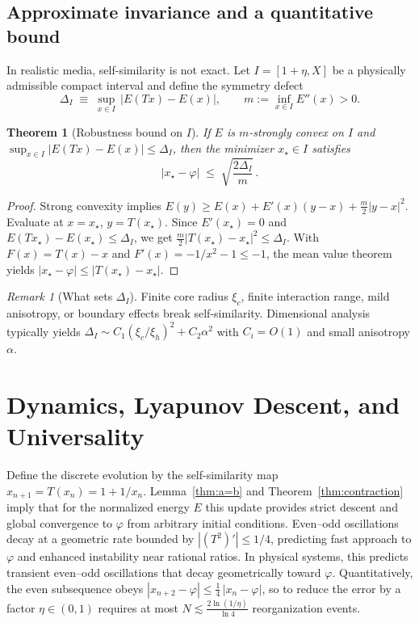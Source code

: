 \documentclass[11pt]{article}
\newtheorem{theorem}{Theorem}
\theoremstyle{remark}
\newtheorem{remark}{Remark}
\theoremstyle{definition}
\newcommand{\ph}{\varphi}
\begin{document}
\subsection{Approximate invariance and a quantitative bound}
In realistic media, self-similarity is not exact. Let $I=[1+\eta,X]$ be a physically admissible compact interval and define the symmetry defect
\begin{equation}
 \Delta_I\;\equiv\;\sup_{x\in I}\,\bigl|E(Tx)-E(x)\bigr|,\qquad m:=\inf_{x\in I}E''(x)>0.
\end{equation}
\begin{theorem}[Robustness bound on $I$]
\label{thm:robust}
If $E$ is $m$-strongly convex on $I$ and $\sup_{x\in I}|E(Tx)-E(x)|\le \Delta_I$, then the minimizer $x_\star\in I$ satisfies
\begin{equation}
 \bigl|x_\star-\ph\bigr|\;\le\;\sqrt{\frac{2\Delta_I}{m}}\,.
\end{equation}
\end{theorem}
\begin{proof}
Strong convexity implies $E(y)\ge E(x)+E'(x)(y-x)+\tfrac{m}{2}|y-x|^2$. Evaluate at $x=x_\star$, $y=T(x_\star)$. Since $E'(x_\star)=0$ and $E(Tx_\star)-E(x_\star)\le \Delta_I$, we get $\tfrac{m}{2}|T(x_\star)-x_\star|^2\le \Delta_I$. With $F(x)=T(x)-x$ and $F'(x)=-1/x^2-1\le-1$, the mean value theorem yields $|x_\star-\ph|\le |T(x_\star)-x_\star|$.
\end{proof}
\begin{remark}[What sets $\Delta_I$]
Finite core radius $\xi_c$, finite interaction range, mild anisotropy, or boundary effects break self-similarity. Dimensional analysis typically yields $\Delta_I\sim C_1(\xi_c/\xi_h)^2 + C_2\alpha^2$ with $C_i=O(1)$ and small anisotropy $\alpha$.
\end{remark}

\section{Dynamics, Lyapunov Descent, and Universality}
Define the discrete evolution by the self-similarity map \(x_{n+1}=T(x_n)=1+1/x_n\). Lemma~\ref{thm:a=b} and Theorem~\ref{thm:contraction} imply that for the normalized energy $E$ this update provides strict descent and global convergence to $\ph$ from arbitrary initial conditions. Even--odd oscillations decay at a geometric rate bounded by \(|(T^2)'|\le 1/4\), predicting fast approach to \(\varphi\) and enhanced instability near rational ratios. In physical systems, this predicts transient even--odd oscillations that decay geometrically toward $\varphi$. Quantitatively, the even subsequence obeys $|x_{n+2}-\varphi|\le \tfrac14\,|x_n-\varphi|$, so to reduce the error by a factor $\eta\in(0,1)$ requires at most $N\lesssim\tfrac{2\ln(1/\eta)}{\ln 4}$ reorganization events.
\end{document}

